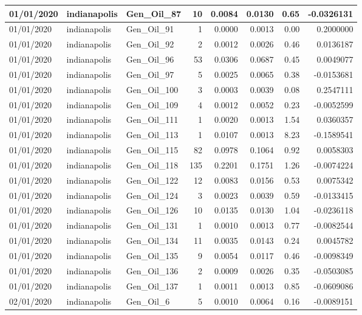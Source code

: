 \documentclass[
  letterpaper,
  DIV=11,
  numbers=noendperiod]{scrartcl}
\begin{document}
\begin{tabular}{l|l|l|r|r|r|r|r}
\hline
01/01/2020 & indianapolis & Gen\_Oil\_87 & 10 & 0.0084 & 0.0130 & 0.65 & -0.0326131\\
\hline
01/01/2020 & indianapolis & Gen\_Oil\_91 & 1 & 0.0000 & 0.0013 & 0.00 & 0.2000000\\
\hline
01/01/2020 & indianapolis & Gen\_Oil\_92 & 2 & 0.0012 & 0.0026 & 0.46 & 0.0136187\\
\hline
01/01/2020 & indianapolis & Gen\_Oil\_96 & 53 & 0.0306 & 0.0687 & 0.45 & 0.0049077\\
\hline
01/01/2020 & indianapolis & Gen\_Oil\_97 & 5 & 0.0025 & 0.0065 & 0.38 & -0.0153681\\
\hline
01/01/2020 & indianapolis & Gen\_Oil\_100 & 3 & 0.0003 & 0.0039 & 0.08 & 0.2547111\\
\hline
01/01/2020 & indianapolis & Gen\_Oil\_109 & 4 & 0.0012 & 0.0052 & 0.23 & -0.0052599\\
\hline
01/01/2020 & indianapolis & Gen\_Oil\_111 & 1 & 0.0020 & 0.0013 & 1.54 & 0.0360357\\
\hline
01/01/2020 & indianapolis & Gen\_Oil\_113 & 1 & 0.0107 & 0.0013 & 8.23 & -0.1589541\\
\hline
01/01/2020 & indianapolis & Gen\_Oil\_115 & 82 & 0.0978 & 0.1064 & 0.92 & 0.0058303\\
\hline
01/01/2020 & indianapolis & Gen\_Oil\_118 & 135 & 0.2201 & 0.1751 & 1.26 & -0.0074224\\
\hline
01/01/2020 & indianapolis & Gen\_Oil\_122 & 12 & 0.0083 & 0.0156 & 0.53 & 0.0075342\\
\hline
01/01/2020 & indianapolis & Gen\_Oil\_124 & 3 & 0.0023 & 0.0039 & 0.59 & -0.0133415\\
\hline
01/01/2020 & indianapolis & Gen\_Oil\_126 & 10 & 0.0135 & 0.0130 & 1.04 & -0.0236118\\
\hline
01/01/2020 & indianapolis & Gen\_Oil\_131 & 1 & 0.0010 & 0.0013 & 0.77 & -0.0082544\\
\hline
01/01/2020 & indianapolis & Gen\_Oil\_134 & 11 & 0.0035 & 0.0143 & 0.24 & 0.0045782\\
\hline
01/01/2020 & indianapolis & Gen\_Oil\_135 & 9 & 0.0054 & 0.0117 & 0.46 & -0.0098349\\
\hline
01/01/2020 & indianapolis & Gen\_Oil\_136 & 2 & 0.0009 & 0.0026 & 0.35 & -0.0503085\\
\hline
01/01/2020 & indianapolis & Gen\_Oil\_137 & 1 & 0.0011 & 0.0013 & 0.85 & -0.0609086\\
\hline
02/01/2020 & indianapolis & Gen\_Oil\_6 & 5 & 0.0010 & 0.0064 & 0.16 & -0.0089151\\

\end{tabular}
\end{document}
